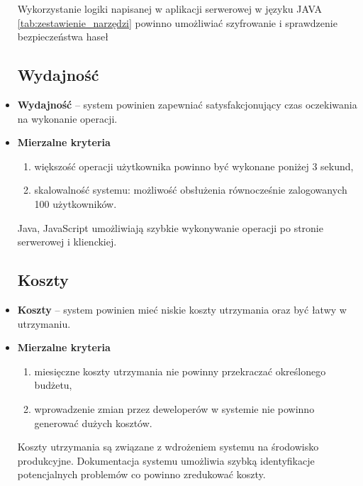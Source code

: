 \begin{itemize}
		Wykorzystanie logiki napisanej w aplikacji serwerowej w języku JAVA \ref{tab:zestawienie_narzędzi} powinno umożliwiać szyfrowanie i sprawdzenie bezpieczeństwa haseł
		
		\subsection{Wydajność}
		\item \textbf{Wydajność} -- system powinien zapewniać satysfakcjonujący czas oczekiwania na wykonanie operacji.
	\item \textbf{Mierzalne kryteria}
		\begin{enumerate}
			\item większość operacji użytkownika powinno być wykonane poniżej 3 sekund,
			\item skalowalność systemu: możliwość obsłużenia równocześnie zalogowanych 100 użytkowników.
		\end{enumerate}
		
		Java, JavaScript umożliwiają szybkie wykonywanie operacji po stronie serwerowej i klienckiej.
		
		\subsection{Koszty}
	\item \textbf{Koszty} -- system powinien mieć niskie koszty utrzymania oraz być łatwy w utrzymaniu.
	\item \textbf{Mierzalne kryteria}
		\begin{enumerate}
			\item miesięczne koszty utrzymania nie powinny przekraczać określonego budżetu,
			\item wprowadzenie zmian przez deweloperów w systemie nie powinno generować dużych kosztów.
		\end{enumerate}
		
	Koszty utrzymania są związane z wdrożeniem systemu na środowisko produkcyjne. Dokumentacja systemu umożliwia szybką identyfikacje potencjalnych problemów co powinno zredukować koszty.
\end{itemize}
 









